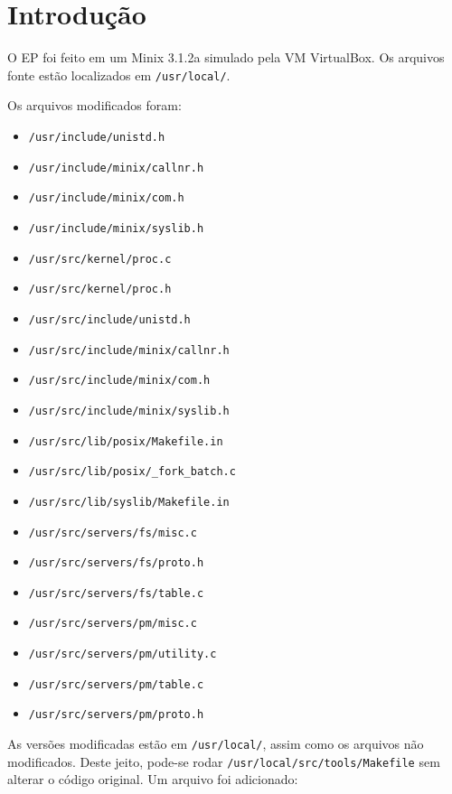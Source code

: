 \documentclass{amsart}
\title[]{\rule{10.5cm}{0.8pt}\\Exercício-Programa 2:\\
Escalonamento de Processos
\\\vspace{2mm}\footnotesize
  Sistemas Operacionais --- MAC0422\\\rule{10cm}{0.8pt}}
\author[]{Renato Lui Geh\\NUSP\@: 8536030\\
          Guilherme Freire\\NUSP\@: 7557373}
\theoremstyle{plain}
\newcommand{\code}[1]{\lstinline[mathescape=true]{#1}}
\begin{document}
\date{\today}
\maketitle

\section{Introdução}

O EP foi feito em um Minix 3.1.2a simulado pela VM VirtualBox. Os arquivos fonte estão localizados
em \code{/usr/local/}.

Os arquivos modificados foram:

\begin{itemize}
  \item \code{/usr/include/unistd.h}
  \item \code{/usr/include/minix/callnr.h}
  \item \code{/usr/include/minix/com.h}
  \item \code{/usr/include/minix/syslib.h}
  \item \code{/usr/src/kernel/proc.c}
  \item \code{/usr/src/kernel/proc.h}
  \item \code{/usr/src/include/unistd.h}
  \item \code{/usr/src/include/minix/callnr.h}
  \item \code{/usr/src/include/minix/com.h}
  \item \code{/usr/src/include/minix/syslib.h}
  \item \code{/usr/src/lib/posix/Makefile.in}
  \item \code{/usr/src/lib/posix/_fork_batch.c}
  \item \code{/usr/src/lib/syslib/Makefile.in}
  \item \code{/usr/src/servers/fs/misc.c}
  \item \code{/usr/src/servers/fs/proto.h}
  \item \code{/usr/src/servers/fs/table.c}
  \item \code{/usr/src/servers/pm/misc.c}
  \item \code{/usr/src/servers/pm/utility.c}
  \item \code{/usr/src/servers/pm/table.c}
  \item \code{/usr/src/servers/pm/proto.h}
\end{itemize}

As versões modificadas estão em \code{/usr/local/}, assim como os arquivos não modificados. Deste
jeito, pode-se rodar \code{/usr/local/src/tools/Makefile} sem alterar o código original. Um arquivo
foi adicionado:
\end{document}
